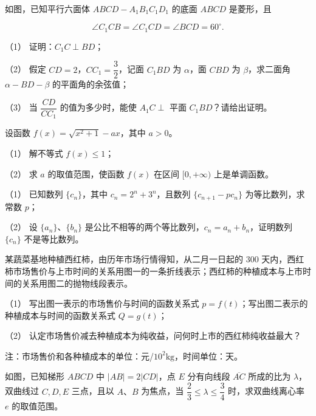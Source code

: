 \Needspace{0.4\textheight}
\begin{question}
如图，已知平行六面体 $ABCD-A_1B_1C_1D_1$ 的底面 $ABCD$ 是菱形，且

\nopagebreak[4]
\[
\angle C_1CB=\angle C_1CD=\angle BCD=60^\circ.
\]

（1） 证明：$C_1C\perp BD$；

（2） 假定 $CD=2$，$CC_1=\dfrac32$，记面 $C_1BD$ 为 $\alpha$，面 $CBD$ 为 $\beta$，求二面角 $\alpha-BD-\beta$ 的平面角的余弦值；

（3） 当 $\dfrac{CD}{CC_1}$ 的值为多少时，能使 $A_1C\perp$ 平面 $C_1BD$？请给出证明。
\nopagebreak[4]
\begin{center}\end{center}
\nopagebreak[4]
\end{question}
\begin{question}
设函数 $f(x)=\sqrt{x^2+1}-ax$，其中 $a>0$。

（1） 解不等式 $f(x)\le1$；

（2） 求 $a$ 的取值范围，使函数 $f(x)$ 在区间 $[0,+\infty)$ 上是单调函数。

\end{question}
\begin{question}

（1） 已知数列 $\{c_n\}$，其中 $c_n=2^n+3^n$，且数列 $\{c_{n+1}-pc_n\}$ 为等比数列，求常数 $p$；

（2） 设 $\{a_n\}$、$\{b_n\}$ 是公比不相等的两个等比数列，$c_n=a_n+b_n$，证明数列 $\{c_n\}$ 不是等比数列。

\Needspace{0.4\textheight}
\end{question}
\begin{question}
某蔬菜基地种植西红柿，由历年市场行情得知，从二月一日起的 300 天内，西红柿市场售价与上市时间的关系用图一的一条折线表示；西红柿的种植成本与上市时间的关系用图二的抛物线段表示。

（1） 写出图一表示的市场售价与时间的函数关系式 $p=f(t)$；写出图二表示的种植成本与时间的函数关系式 $Q=g(t)$；

（2） 认定市场售价减去种植成本为纯收益，问何时上市的西红柿纯收益最大？

注：市场售价和各种植成本的单位：元/$10^2\mathrm{kg}$，时间单位：天。
\nopagebreak[4]
\begin{center}\end{center}
\nopagebreak[4]
\Needspace{0.4\textheight}
\end{question}
\begin{question}
如图，已知梯形 $ABCD$ 中 $|AB|=2|CD|$，点 $E$ 分有向线段 $\overline{AC}$ 所成的比为 $\lambda$，双曲线过 $C,D,E$ 三点，且以 $A\text{、}B$ 为焦点，当 $\dfrac23\le\lambda\le\dfrac34$ 时，求双曲线离心率 $e$ 的取值范围。
\nopagebreak[4]
\begin{center}\end{center}
\nopagebreak[4]

\end{question}